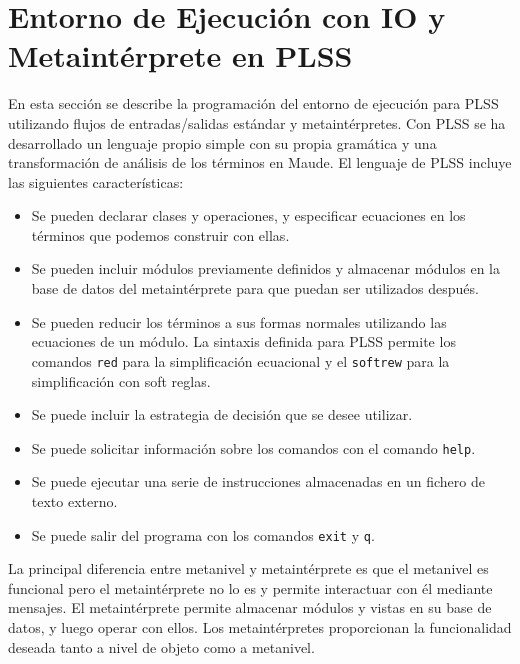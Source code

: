 \section{Entorno de Ejecución con IO y Metaintérprete en PLSS}

En esta sección se describe la programación del entorno de ejecución para PLSS utilizando flujos de entradas/salidas estándar y metaintérpretes.
%
Con PLSS se ha desarrollado un lenguaje propio simple con su propia gramática y una transformación de análisis de los términos en Maude.
%
El lenguaje de PLSS incluye las siguientes características:
\begin{itemize}
\item Se pueden declarar clases y operaciones, y especificar ecuaciones en los términos que podemos construir con ellas.
\item Se pueden incluir módulos previamente definidos y almacenar módulos en la base de datos del metaintérprete para que puedan ser utilizados después.

\item Se pueden reducir los términos a sus formas normales utilizando las ecuaciones de un módulo. La sintaxis definida para PLSS permite los comandos \texttt{red} para la simplificación ecuacional y el \texttt{softrew} para la simplificación con soft reglas.

\item Se puede incluir la estrategia de decisión que se desee utilizar.

\item Se puede solicitar información sobre los comandos con el comando \texttt{help}.

\item Se puede ejecutar una serie de instrucciones almacenadas en un fichero de texto externo.

\item Se puede salir del programa con los comandos \texttt{exit} y \texttt{q}.
\end{itemize}
\medskip

La principal diferencia entre metanivel y metaintérprete es que el metanivel es funcional pero el metaintérprete no lo es y permite interactuar con él mediante mensajes. El metaintérprete permite almacenar módulos y vistas en su base de datos, y luego operar con ellos.
%
Los metaintérpretes proporcionan la funcionalidad deseada tanto a nivel de objeto como a metanivel.
\medskip


